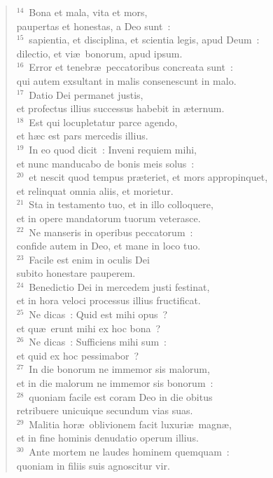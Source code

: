 \begin{verse}${}^{14}$~Bona et mala, vita et mors,\\ paupertas et honestas, a Deo sunt~:\\
${}^{15}$~sapientia, et disciplina, et scientia legis, apud Deum~:\\ dilectio, et vi\ae\ bonorum, apud ipsum.\\
${}^{16}$~Error et tenebr\ae\ peccatoribus concreata sunt~:\\ qui autem exsultant in malis consenescunt in malo.\\
${}^{17}$~Datio Dei permanet justis,\\ et profectus illius successus habebit in \ae ternum.\\
${}^{18}$~Est qui locupletatur parce agendo,\\ et h\ae c est pars mercedis illius.\\
${}^{19}$~In eo quod dicit~: Inveni requiem mihi,\\ et nunc manducabo de bonis meis solus~:\\
${}^{20}$~et nescit quod tempus pr\ae teriet, et mors appropinquet,\\ et relinquat omnia aliis, et morietur.\\
${}^{21}$~Sta in testamento tuo, et in illo colloquere,\\ et in opere mandatorum tuorum veterasce.\\
${}^{22}$~Ne manseris in operibus peccatorum~:\\ confide autem in Deo, et mane in loco tuo.\\
${}^{23}$~Facile est enim in oculis Dei\\ subito honestare pauperem.\\
${}^{24}$~Benedictio Dei in mercedem justi festinat,\\ et in hora veloci processus illius fructificat.\\
${}^{25}$~Ne dicas~: Quid est mihi opus~?\\ et qu\ae\ erunt mihi ex hoc bona~?\\
${}^{26}$~Ne dicas~: Sufficiens mihi sum~:\\ et quid ex hoc pessimabor~?\\
${}^{27}$~In die bonorum ne immemor sis malorum,\\ et in die malorum ne immemor sis bonorum~:\\
${}^{28}$~quoniam facile est coram Deo in die obitus\\ retribuere unicuique secundum vias suas.\\
${}^{29}$~Malitia hor\ae\ oblivionem facit luxuri\ae\ magn\ae ,\\ et in fine hominis denudatio operum illius.\\
${}^{30}$~Ante mortem ne laudes hominem quemquam~:\\ quoniam in filiis suis agnoscitur vir.\end{verse}


